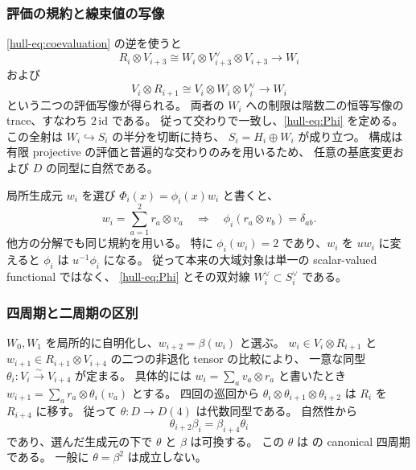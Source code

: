 \subsubsection{評価の規約と線束値の写像}

\eqref{hull-eq:coevaluation} の逆を使うと
\[
 R_i\otimes V_{i+3}\cong
 W_i\otimes V_{i+3}^{\vee}\otimes V_{i+3}\longrightarrow W_i
\]
および
\[
 V_i\otimes R_{i+1}\cong
 V_i\otimes W_i\otimes V_i^{\vee}\longrightarrow W_i
\]
という二つの評価写像が得られる。
両者の $W_i$ への制限は階数二の恒等写像の trace、すなわち $2\,\mathrm{id}$ である。
従って交わりで一致し、\eqref{hull-eq:Phi} を定める。
この全射は $W_i\hookrightarrow S_i$ の半分を切断に持ち、
$S_i=H_i\oplus W_i$ が成り立つ。
構成は有限 projective の評価と普遍的な交わりのみを用いるため、
任意の基底変更および $D$ の同型に自然である。

局所生成元 $w_i$ を選び $\Phi_i(x)=\phi_i(x)w_i$ と書くと、
\[
 w_i=\sum_{a=1}^2r_a\otimes v_a
 \quad\Longrightarrow\quad
 \phi_i(r_a\otimes v_b)=\delta_{ab}.
 \tag{UH-7}\label{hull-eq:inverse-coeval}
\]
他方の分解でも同じ規約を用いる。
特に $\phi_i(w_i)=2$ であり、$w_i$ を $u w_i$ に変えると
$\phi_i$ は $u^{-1}\phi_i$ になる。
従って本来の大域対象は単一の scalar-valued functional ではなく、
\eqref{hull-eq:Phi} とその双対線 $W_i^{\vee}\subset S_i^{\vee}$ である。

\subsubsection{四周期と二周期の区別}

$W_0,W_1$ を局所的に自明化し、$w_{i+2}=\beta(w_i)$ と選ぶ。
$w_i\in V_i\otimes R_{i+1}$ と
$w_{i+1}\in R_{i+1}\otimes V_{i+4}$ の二つの非退化 tensor の比較により、
一意な同型 $\theta_i:V_i\xrightarrow{\sim}V_{i+4}$ が定まる。
具体的には $w_i=\sum_a v_a\otimes r_a$ と書いたとき
$w_{i+1}=\sum_a r_a\otimes\theta_i(v_a)$ とする。
四回の巡回から $\theta_i\otimes\theta_{i+1}\otimes\theta_{i+2}$ は
$R_i$ を $R_{i+4}$ に移す。
従って $\theta:D\to D(4)$ は代数同型である。
自然性から
\[
 \theta_{i+2}\beta_i=\beta_{i+4}\theta_i
 \tag{UH-8}\label{hull-eq:commute}
\]
であり、選んだ生成元の下で $\theta$ と $\beta$ は可換する。
この $\theta$ は \cite[\S5.2, (5.2)]{VdB2011} の canonical 四周期である。
一般に $\theta=\beta^2$ は成立しない。

